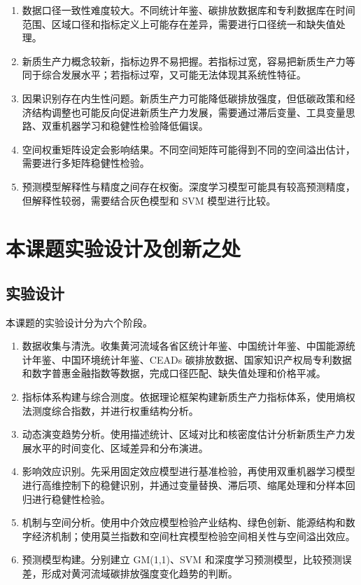 \documentclass[UTF8,a4paper,zihao=-4,fontset=windows]{ctexart}
\newcommand{\regionscope}{黄河流域}
\begin{document}
\begin{enumerate}[label=\arabic*.]
  \item 数据口径一致性难度较大。不同统计年鉴、碳排放数据库和专利数据库在时间范围、区域口径和指标定义上可能存在差异，需要进行口径统一和缺失值处理。
  \item 新质生产力概念较新，指标边界不易把握。若指标过宽，容易把新质生产力等同于综合发展水平；若指标过窄，又可能无法体现其系统性特征。
  \item 因果识别存在内生性问题。新质生产力可能降低碳排放强度，但低碳政策和经济结构调整也可能反向促进新质生产力发展，需要通过滞后变量、工具变量思路、双重机器学习和稳健性检验降低偏误。
  \item 空间权重矩阵设定会影响结果。不同空间矩阵可能得到不同的空间溢出估计，需要进行多矩阵稳健性检验。
  \item 预测模型解释性与精度之间存在权衡。深度学习模型可能具有较高预测精度，但解释性较弱，需要结合灰色模型和 SVM 模型进行比较。
\end{enumerate}

\section{本课题实验设计及创新之处}

\subsection{实验设计}

本课题的实验设计分为六个阶段。

\begin{enumerate}[label=\arabic*.]
  \item 数据收集与清洗。收集\regionscope 各省区统计年鉴、中国统计年鉴、中国能源统计年鉴、中国环境统计年鉴、CEADs 碳排放数据、国家知识产权局专利数据和数字普惠金融指数等数据，完成口径匹配、缺失值处理和价格平减。
  \item 指标体系构建与综合测度。依据理论框架构建新质生产力指标体系，使用熵权法测度综合指数，并进行权重结构分析。
  \item 动态演变趋势分析。使用描述统计、区域对比和核密度估计分析新质生产力发展水平的时间变化、区域差异和分布演进。
  \item 影响效应识别。先采用固定效应模型进行基准检验，再使用双重机器学习模型进行高维控制下的稳健识别，并通过变量替换、滞后项、缩尾处理和分样本回归进行稳健性检验。
  \item 机制与空间分析。使用中介效应模型检验产业结构、绿色创新、能源结构和数字经济机制；使用莫兰指数和空间杜宾模型检验空间相关性与空间溢出效应。
  \item 预测模型构建。分别建立 GM(1,1)、SVM 和深度学习预测模型，比较预测误差，形成对\regionscope 碳排放强度变化趋势的判断。
\end{enumerate}
\end{document}
